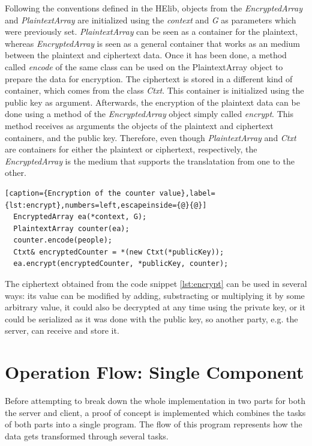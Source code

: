 Following the conventions defined in the HElib, objects from the \textit{EncryptedArray} and \textit{PlaintextArray} are initialized using the \textit{context} and \textit{G} as parameters which were previously set. \textit{PlaintextArray} can be seen as a container for the plaintext, whereas \textit{EncryptedArray} is seen as a general container that works as an medium between the plaintext and ciphertext data. Once it has been done, a method called \textit{encode} of the same class can be used on the PlaintextArray object to prepare the data for encryption. The ciphertext is stored in a different kind of container, which comes from the class \textit{Ctxt}. This container is initialized using the public key as argument. Afterwards, the encryption of the plaintext data can be done using a method of the \textit{EncryptedArray} object simply called \textit{encrypt}. This method receives as arguments the objects of the plaintext and ciphertext containers, and the public key. Therefore, even though \textit{PlaintextArray} and \textit{Ctxt} are containers for either the plaintext or ciphertext, respectively, the \textit{EncryptedArray} is the medium that supports the translatation from one to the other.

\begin{lstlisting}[caption={Encryption of the counter value},label={lst:encrypt},numbers=left,escapeinside={@}{@}]
  EncryptedArray ea(*context, G);
  PlaintextArray counter(ea);  
  counter.encode(people);
  Ctxt& encryptedCounter = *(new Ctxt(*publicKey));  
  ea.encrypt(encryptedCounter, *publicKey, counter); 
\end{lstlisting}

The ciphertext obtained from the code snippet \ref{lst:encrypt} can be used in several ways: its value can be modified by adding, substracting or multiplying it by some arbitrary value, it could also be decrypted at any time using the private key, or it could be serialized as it was done with the public key, so another party, e.g. the server, can receive and store it.

\section{{Operation Flow: Single Component}}

Before attempting to break down the whole implementation in two parts for both the server and client, a proof of concept is implemented which combines the tasks of both parts into a single program. The flow of this program represents how the data gets transformed through several tasks. 

